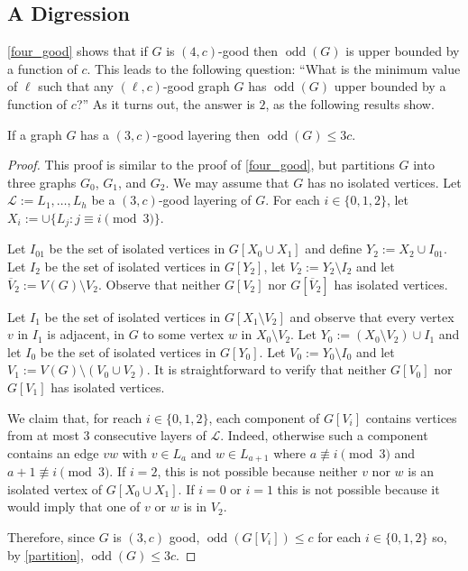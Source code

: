 \documentclass{patmorin}
\DeclareMathOperator{\odd}{odd}
\begin{document}
\subsection{A Digression}

\cref{four_good} shows that if $G$ is $(4,c)$-good then $\odd(G)$ is upper bounded by a function of $c$.  This leads to the following question:  ``What is the minimum value of $\ell$ such that any $(\ell,c)$-good graph $G$ has $\odd(G)$ upper bounded by a function of $c$?''  As it turns out, the answer is $2$, as the following results show.

\begin{lem}\label{three_good}
  If a graph $G$ has a $(3,c)$-good layering then $\odd(G)\le 3c$.
\end{lem}

\begin{proof}
  This proof is similar to the proof of \cref{four_good}, but partitions $G$ into three graphs $G_0$, $G_1$, and $G_2$.  We may assume that $G$ has no isolated vertices. Let $\mathcal{L}:=L_1,\ldots,L_h$ be a $(3,c)$-good layering of $G$. For each $i\in\{0,1,2\}$, let $X_i:=\cup\{L_j:j\equiv i\pmod 3\}$.  
  
  Let $I_{01}$ be the set of isolated vertices in $G[X_0\cup X_1]$ and define $Y_2:=X_2\cup I_{01}$.  Let $I_2$ be the set of isolated vertices in $G[Y_2]$, let $V_2:=Y_2\setminus I_2$ and let $\overline{V}_2:=V(G)\setminus V_2$.  Observe that neither $G[V_2]$ nor $G[\overline{V}_2]$ has isolated vertices.
  
  Let $I_1$ be the set of isolated vertices in $G[X_1\setminus V_2]$ and observe that every vertex $v$ in $I_1$ is adjacent, in $G$ to some vertex $w$ in $X_0\setminus V_2$.  Let $Y_0:=(X_0\setminus V_2)\cup I_1$ and let $I_0$ be the set of isolated vertices in $G[Y_0]$.  Let $V_0:=Y_0\setminus I_0$ and let $V_1:=V(G)\setminus(V_0\cup V_2)$.  It is straightforward to verify that neither $G[V_0]$ nor $G[V_1]$ has isolated vertices.
  
  We claim that, for reach $i\in\{0,1,2\}$, each component of $G[V_i]$ contains vertices from at most $3$ consecutive layers of $\mathcal{L}$.  Indeed, otherwise such a component contains an edge $vw$ with $v\in L_a$ and $w\in L_{a+1}$ where $a\not\equiv i\pmod 3$ and $a+1\not\equiv i\pmod 3$.  If $i=2$, this is not possible because neither $v$ nor $w$ is an isolated vertex of $G[X_0\cup X_1]$.  If $i=0$ or $i = 1$ this is not possible because it would imply that one of $v$ or $w$ is in $V_2$.
  
  Therefore, since $G$ is $(3,c)$ good, $\odd(G[V_i])\le c$ for each $i\in\{0,1,2\}$ so, by \cref{partition}, $\odd(G)\le 3c$.
\end{proof}
\end{document}
